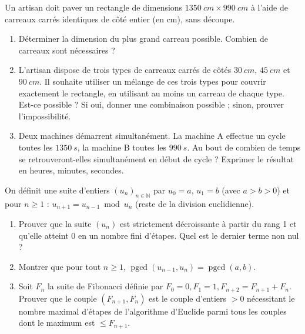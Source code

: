 \documentclass[11pt]{article}
\begin{document}
\begin{exercice}
Un artisan doit paver un rectangle de dimensions $\SI{1350}{cm} \times \SI{990}{cm}$ à l'aide de carreaux carrés identiques de côté entier (en cm), sans découpe.
\begin{enumerate}
    \item Déterminer la dimension du plus grand carreau possible. Combien de carreaux sont nécessaires ?
    \item L'artisan dispose de trois types de carreaux carrés de côtés $\SI{30}{cm}$, $\SI{45}{cm}$ et $\SI{90}{cm}$. Il souhaite utiliser un mélange de ces trois types pour couvrir exactement le rectangle, en utilisant au moins un carreau de chaque type. Est-ce possible ? Si oui, donner une combinaison possible ; sinon, prouver l'impossibilité.
    \item Deux machines démarrent simultanément. La machine A effectue un cycle toutes les $\SI{1350}{s}$, la machine B toutes les $\SI{990}{s}$. Au bout de combien de temps se retrouveront-elles simultanément en début de cycle ? Exprimer le résultat en heures, minutes, secondes.
\end{enumerate}
\end{exercice}

\begin{exercice}
On définit une suite d'entiers $(u_n)_{n \in \mathbb{N}}$ par $u_0 = a$, $u_1 = b$ (avec $a > b > 0$) et pour $n \ge 1$ : $u_{n+1} = u_{n-1} \bmod u_n$ (reste de la division euclidienne).
\begin{enumerate}
    \item Prouver que la suite $(u_n)$ est strictement décroissante à partir du rang 1 et qu'elle atteint $0$ en un nombre fini d'étapes. Quel est le dernier terme non nul ?
    \item Montrer que pour tout $n \ge 1$, $\operatorname{pgcd}(u_{n-1}, u_n) = \operatorname{pgcd}(a, b)$.
    \item Soit $F_n$ la suite de Fibonacci définie par $F_0=0, F_1=1, F_{n+2}=F_{n+1}+F_n$. Prouver que le couple $(F_{n+1}, F_n)$ est le couple d'entiers $>0$ nécessitant le nombre maximal d'étapes de l'algorithme d'Euclide parmi tous les couples dont le maximum est $\le F_{n+1}$.
\end{enumerate}
\end{exercice}
\end{document}
